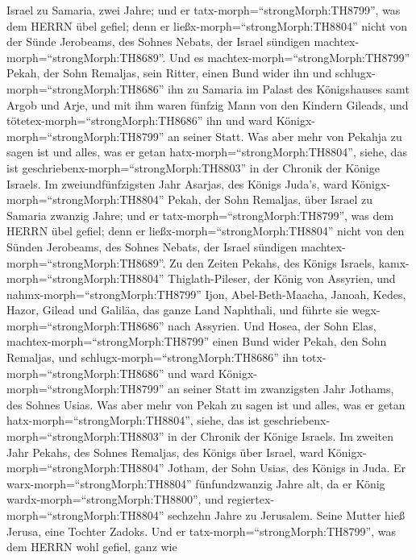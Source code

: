 Israel zu Samaria, zwei Jahre;  und er
tatx-morph=``strongMorph:TH8799'', was dem HERRN übel gefiel; denn er
ließx-morph=``strongMorph:TH8804'' nicht von der Sünde Jerobeams, des
Sohnes Nebats, der Israel sündigen machtex-morph=``strongMorph:TH8689''.
 Und es machtex-morph=``strongMorph:TH8799'' Pekah, der
Sohn Remaljas, sein Ritter, einen Bund wider ihn und
schlugx-morph=``strongMorph:TH8686'' ihn zu Samaria im Palast des
Königshauses samt Argob und Arje, und mit ihm waren fünfzig Mann von den
Kindern Gileads, und tötetex-morph=``strongMorph:TH8686'' ihn und ward
Königx-morph=``strongMorph:TH8799'' an seiner Statt.  Was
aber mehr von Pekahja zu sagen ist und alles, was er getan
hatx-morph=``strongMorph:TH8804'', siehe, das ist
geschriebenx-morph=``strongMorph:TH8803'' in der Chronik der Könige
Israels.  Im zweiundfünfzigsten Jahr Asarjas, des Königs
Juda's, ward Königx-morph=``strongMorph:TH8804'' Pekah, der Sohn
Remaljas, über Israel zu Samaria zwanzig Jahre;  und er
tatx-morph=``strongMorph:TH8799'', was dem HERRN übel gefiel; denn er
ließx-morph=``strongMorph:TH8804'' nicht von den Sünden Jerobeams, des
Sohnes Nebats, der Israel sündigen machtex-morph=``strongMorph:TH8689''.
 Zu den Zeiten Pekahs, des Königs Israels,
kamx-morph=``strongMorph:TH8804'' Thiglath-Pileser, der König von
Assyrien, und nahmx-morph=``strongMorph:TH8799'' Ijon, Abel-Beth-Maacha,
Janoah, Kedes, Hazor, Gilead und Galiläa, das ganze Land Naphthali, und
führte sie wegx-morph=``strongMorph:TH8686'' nach Assyrien.
 Und Hosea, der Sohn Elas,
machtex-morph=``strongMorph:TH8799'' einen Bund wider Pekah, den Sohn
Remaljas, und schlugx-morph=``strongMorph:TH8686'' ihn
totx-morph=``strongMorph:TH8686'' und ward
Königx-morph=``strongMorph:TH8799'' an seiner Statt im zwanzigsten Jahr
Jothams, des Sohnes Usias.  Was aber mehr von Pekah zu
sagen ist und alles, was er getan hatx-morph=``strongMorph:TH8804'',
siehe, das ist geschriebenx-morph=``strongMorph:TH8803'' in der Chronik
der Könige Israels.  Im zweiten Jahr Pekahs, des Sohnes
Remaljas, des Königs über Israel, ward
Königx-morph=``strongMorph:TH8804'' Jotham, der Sohn Usias, des Königs
in Juda.  Er warx-morph=``strongMorph:TH8804''
fünfundzwanzig Jahre alt, da er König
wardx-morph=``strongMorph:TH8800'', und
regiertex-morph=``strongMorph:TH8804'' sechzehn Jahre zu Jerusalem.
Seine Mutter hieß Jerusa, eine Tochter Zadoks.  Und er
tatx-morph=``strongMorph:TH8799'', was dem HERRN wohl gefiel, ganz wie
